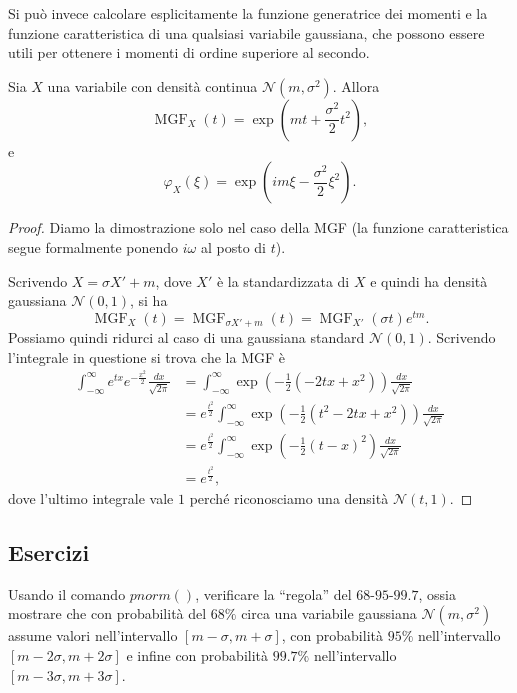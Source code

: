 \documentclass[
  italian,
  letterpaper,
]{book}
\newcommand{\bra}[1]{\left( #1 \right)}
\theoremstyle{definition}
\theoremstyle{remark}
\begin{document}
Si può invece calcolare esplicitamente la funzione generatrice dei
momenti e la funzione caratteristica di una qualsiasi variabile
gaussiana, che possono essere utili per ottenere i momenti di ordine
superiore al secondo.

Sia \(X\) una variabile con densità continua
\(\mathcal{N}(m, \sigma^2)\). Allora
\[ \operatorname{MGF}_X(t) = \exp\bra{ mt + \frac{\sigma^2}{2} t^2},\] e
\[ \varphi_X(\xi) = \exp\bra{ im\xi - \frac{\sigma^2}{2} \xi^2}.\]

\begin{proof}
Diamo la dimostrazione solo nel caso della MGF (la funzione
caratteristica segue formalmente ponendo \(i \omega\) al posto di
\(t\)).

Scrivendo \(X = \sigma X' + m\), dove \(X'\) è la standardizzata di
\(X\) e quindi ha densità gaussiana \(\mathcal{N}(0,1)\), si ha
\[ \operatorname{MGF}_X(t ) =\operatorname{MGF}_{\sigma X' +m} (t ) = \operatorname{MGF}_{X'}(\sigma t) e^{tm}.\]
Possiamo quindi ridurci al caso di una gaussiana standard
\(\mathcal{N}(0,1)\). Scrivendo l'integrale in questione si trova che la
MGF è
\[\begin{split} \int_{-\infty}^\infty e^{tx} e^{- \frac{ x^2}{2}} \frac{d x}{\sqrt{ 2 \pi}} & = \int_{-\infty}^\infty \exp\bra{- \frac 1 2 \bra{ - 2 tx +x^2 }} \frac{d x}{\sqrt{ 2 \pi}}\\
& = e^{\frac {t^2}{2}} \int_{-\infty}^\infty \exp\bra{- \frac 1 2 \bra{ t^2 - 2 tx +x^2 }} \frac{d x}{\sqrt{ 2 \pi}}\\
&  = e^{\frac {t^2}{2}} \int_{-\infty}^\infty \exp\bra{- \frac 1 2 \bra{ t-x}^2  } \frac{d x}{\sqrt{ 2 \pi}}\\
& = e^{\frac {t^2}{2}},
\end{split}\] dove l'ultimo integrale vale \(1\) perché riconosciamo una
densità \(\mathcal{N}(t,1)\).
\end{proof}

\subsection{Esercizi}\label{esercizi-25}

Usando il comando \(pnorm()\), verificare la ``regola'' del
\(68\)-\(95\)-\(99.7\), ossia mostrare che con probabilità del \(68\%\)
circa una variabile gaussiana \(\mathcal{N}(m, \sigma^2)\) assume valori
nell'intervallo \([m-\sigma, m+\sigma]\), con probabilità \(95\%\)
nell'intervallo \([m-2\sigma, m+2 \sigma]\) e infine con probabilità
\(99.7\%\) nell'intervallo \([m-3\sigma, m+3\sigma]\).
\end{document}
